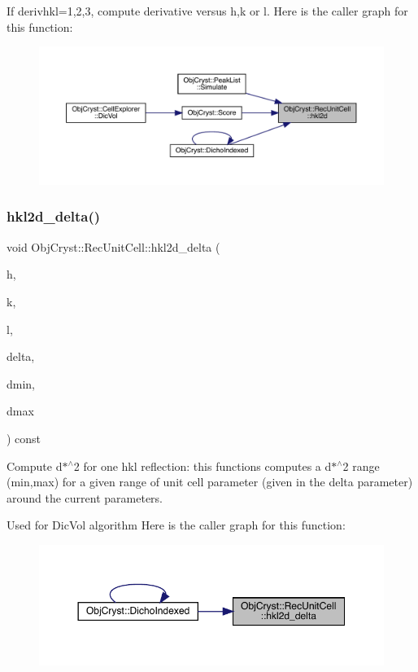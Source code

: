 If derivhkl=1,2,3, compute derivative versus h,k or l. Here is the caller graph for this function\+:
\nopagebreak
\begin{figure}[H]
\begin{center}
\leavevmode
\includegraphics[width=350pt]{class_obj_cryst_1_1_rec_unit_cell_a677f7a039a1018695f242a0e3868945b_icgraph}
\end{center}
\end{figure}
\mbox{\label{class_obj_cryst_1_1_rec_unit_cell_a04469a03019e95f911ca7f04604f7ff8}} 
\subsubsection{\texorpdfstring{hkl2d\_delta()}{hkl2d\_delta()}}
{\footnotesize\ttfamily void Obj\+Cryst\+::\+Rec\+Unit\+Cell\+::hkl2d\+\_\+delta (\begin{DoxyParamCaption}\item[{const float}]{h,  }\item[{const float}]{k,  }\item[{const float}]{l,  }\item[{const \mbox{\hyperlink{class_obj_cryst_1_1_rec_unit_cell}{Rec\+Unit\+Cell}} \&}]{delta,  }\item[{float \&}]{dmin,  }\item[{float \&}]{dmax }\end{DoxyParamCaption}) const}

Compute d$\ast$$^\wedge$2 for one hkl reflection\+: this functions computes a d$\ast$$^\wedge$2 range (min,max) for a given range of unit cell parameter (given in the delta parameter) around the current parameters.

Used for Dic\+Vol algorithm Here is the caller graph for this function\+:
\nopagebreak
\begin{figure}[H]
\begin{center}
\leavevmode
\includegraphics[width=350pt]{class_obj_cryst_1_1_rec_unit_cell_a04469a03019e95f911ca7f04604f7ff8_icgraph}
\end{center}
\end{figure}



